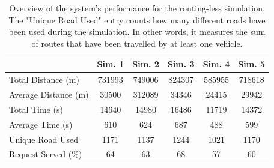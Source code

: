 \begin{table}[h]
	\centering
	\begin{tabular}{ |p{3.7cm}|c|c|c|c|c|}
		\hline
		& Sim. 1 & Sim. 2 & Sim. 3 & Sim. 4 & Sim. 5 \\
		\hline
		Total Distance (m)    &731993& 749006   & 824307 & 585955& 718618 \\
		Average Distance (m)  &30500 & 312089  & 34346 & 24415& 29942\\
		Total Time (s)         &14640& 14980  & 16486 & 11719& 14372\\
		Average Time (s)      & 610& 624   & 687 & 488& 599\\
		Unique Road Used 				&1171&1137&1244&1021& 1170\\
		Request Served  (\%)&64 & 63   & 68 & 57&60 \\
	\end{tabular}
	
	\caption[Overview of the system's performance for the routing-less simulation.]{Overview of the system's performance for the routing-less simulation. The "Unique Road Used" entry counts how many different roads have been used during the simulation. In other words, it measures the sum of routes that have been travelled by at least one vehicle. }
	\label{tab:routingless_simu_performance}   
\end{table}
